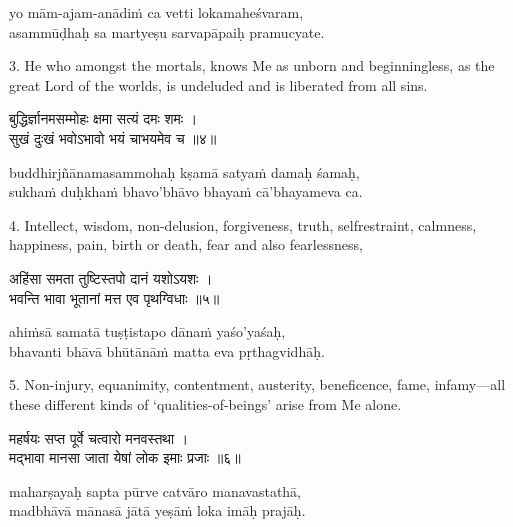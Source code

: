 \begin{transliteration}
yo mām-ajam-anādiṁ ca vetti lokamaheśvaram, \\
asammūḍhaḥ sa martyeṣu sarvapāpaiḥ pramucyate.
\end{transliteration}

3. He who amongst the mortals, knows Me as unborn and beginningless, as the
great Lord of the worlds, is undeluded and is liberated from all sins.

\begin{gitaverse}
बुद्धिर्ज्ञानमसम्मोहः क्षमा सत्यं दमः शमः । \\
सुखं दुःखं भवोऽभावो भयं चाभयमेव च ॥४॥
\end{gitaverse}

\begin{transliteration}
buddhirjñānamasammohaḥ kṣamā satyaṁ damaḥ śamaḥ, \\
sukhaṁ duḥkhaṁ bhavo'bhāvo bhayaṁ cā'bhayameva ca.
\end{transliteration}

4. Intellect, wisdom, non-delusion, forgiveness, truth, selfrestraint,
calmness, happiness, pain, birth or death, fear and also fearlessness,

\begin{gitaverse}
अहिंसा समता तुष्टिस्तपो दानं यशोऽयशः । \\
भवन्ति भावा भूतानां मत्त एव पृथग्विधाः ॥५॥
\end{gitaverse}

\begin{transliteration}
ahiṁsā samatā tuṣṭistapo dānaṁ yaśo'yaśaḥ, \\
bhavanti bhāvā bhūtānāṁ matta eva pṛthagvidhāḥ.
\end{transliteration}

5. Non-injury, equanimity, contentment, austerity, beneficence, fame,
infamy---all these different kinds of `qualities-of-beings' arise from Me
alone.

\begin{gitaverse}
महर्षयः सप्त पूर्वे चत्वारो मनवस्तथा । \\
मद्भावा मानसा जाता येषां लोक इमाः प्रजाः ॥६॥
\end{gitaverse}

\begin{transliteration}
maharṣayaḥ sapta pūrve catvāro manavastathā, \\
madbhāvā mānasā jātā yeṣāṁ loka imāḥ prajāḥ.
\end{transliteration}


